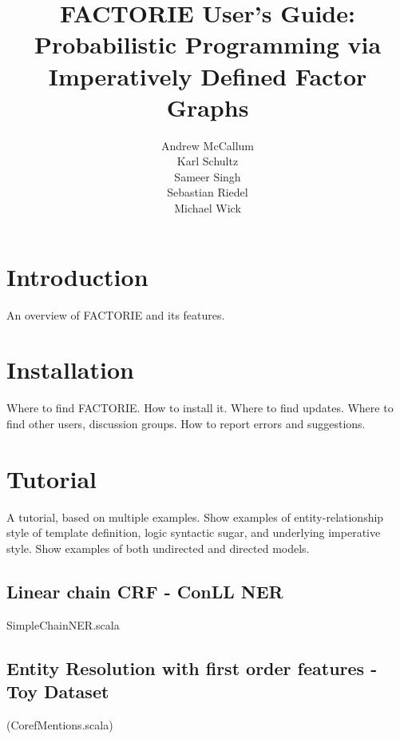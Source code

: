 \documentclass[]{manual}
\title{FACTORIE User's Guide:\\
Probabilistic Programming via Imperatively Defined Factor Graphs}
\author{Andrew McCallum \\ Karl Schultz \\ Sameer Singh \\ Sebastian Riedel \\ Michael Wick}
\begin{document}
\maketitle

\tableofcontents


\chapter{Introduction}
\label{chap:intro}

An overview of FACTORIE and its features.

\chapter{Installation}
\label{chap:install}

Where to find FACTORIE.  How to install it.  Where to find updates.
Where to find other users, discussion groups.  How to report errors
and suggestions.


\chapter{Tutorial}
\label{chap:tutorial}

A tutorial, based on multiple examples.  Show examples of
entity-relationship style of template definition, logic syntactic
sugar, and underlying imperative style.  Show examples of both
undirected and directed models.

\section{Linear chain CRF - ConLL NER}
SimpleChainNER.scala

\section{Entity Resolution with first order features - Toy Dataset}
(CorefMentions.scala)

\end{document}
